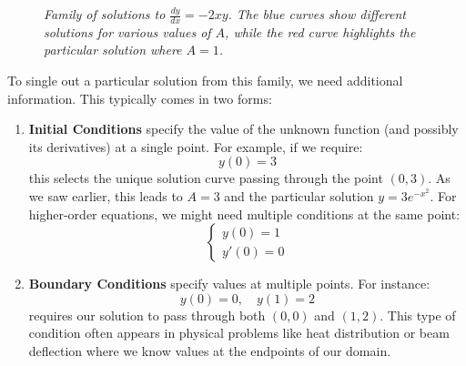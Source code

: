 \begin{figure}[H]
\centering
{}
\caption{\textit{Family of solutions to $\frac{dy}{dx} = -2xy$. The blue curves show different solutions for various values of $A$, while the red curve highlights the particular solution where $A=1$.}}
\label{fig:solution_family}
\end{figure}

\noindent To single out a particular solution from this family, we need additional information. This typically comes in two forms:
\begin{enumerate}

\item \textbf{Initial Conditions}  specify the value of the unknown function (and possibly its derivatives) at a single point. For example, if we require:
\[
y(0) = 3
\]
this selects the unique solution curve passing through the point $(0,3)$. As we saw earlier, this leads to $A=3$ and the particular solution $y = 3e^{-x^2}$. For higher-order equations, we might need multiple conditions at the same point:
\[
\begin{cases} 
y(0) = 1 \\ 
y'(0) = 0 
\end{cases}
\]

\item \textbf{Boundary Conditions}  specify values at multiple points. For instance:
\[
y(0) = 0, \quad y(1) = 2
\]
requires our solution to pass through both $(0,0)$ and $(1,2)$. This type of condition often appears in physical problems like heat distribution or beam deflection where we know values at the endpoints of our domain.
\end{enumerate}

